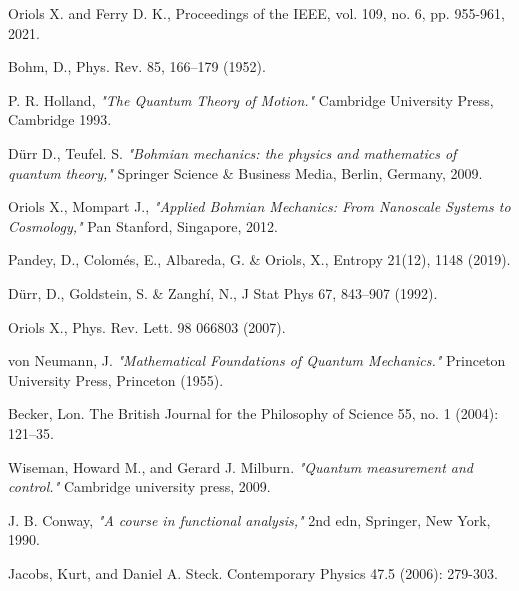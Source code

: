 \documentclass[11pt, a4paper]{article} %
\begin{document}
\newpage
\twocolumn
\begin{thebibliography}{1}
{\footnotesize 

Oriols X. and Ferry D. K., Proceedings of the IEEE, vol. 109, no. 6, pp. 955-961, 2021.

Bohm, D., Phys. Rev. 85, 166–179 (1952).

P. R. Holland, {\em "The Quantum Theory of Motion."} Cambridge University Press, Cambridge 1993.

Dürr D., Teufel. S. {\em "Bohmian mechanics: the physics and mathematics of quantum theory,"} Springer Science \& Business Media, Berlin, Germany, 2009.

	Oriols X., Mompart J., {\em "Applied Bohmian Mechanics: From Nanoscale Systems to Cosmology,"} Pan Stanford, Singapore, 2012.
	
Pandey, D., Colomés, E., Albareda, G. \& Oriols, X., Entropy 21(12), 1148 (2019).

Dürr, D., Goldstein, S. \& Zanghí, N., J Stat Phys 67, 843–907 (1992).

Oriols X., Phys. Rev. Lett. 98 066803 (2007).


von Neumann, J. {\em "Mathematical Foundations of Quantum Mechanics."} Princeton University Press, Princeton (1955).

Becker, Lon. The British Journal for the Philosophy of Science 55, no. 1 (2004): 121–35.


Wiseman, Howard M., and Gerard J. Milburn. {\em "Quantum measurement and control."} Cambridge university press, 2009.

J. B. Conway, {\em "A course in functional analysis,"} 2nd edn, Springer, New York, 1990.

Jacobs, Kurt, and Daniel A. Steck. Contemporary Physics 47.5 (2006): 279-303.

}
\end{thebibliography}
\end{document}
